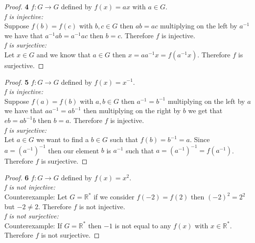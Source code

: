\documentclass[11pt]{article}
\begin{document}
		\begin{proof}{\textbf{4}} $f: G \rightarrow G$ defined by $f(x)=ax$ with $a \in G$.\\
			\textit{f is injective:}\\
				Suppose $f(b)=f(c)$ with $b,c \in G$ then $ab=ac$ multiplying on the left by $a^{-1}$ we have that $a^{-1}ab=a^{-1}ac$ then $b=c$. Therefore $f$ is injective.
			\\\textit{f is surjective:}\\
				Let $x \in G$ and we know that $a \in G$ then $x=aa^{-1}x=f(a^{-1}x)$. Therefore $f$ is surjective.
		\end{proof}
\cleardoublepage

		\begin{proof}{\textbf{5}} $f: G \rightarrow G$ defined by $f(x)=x^{-1}$.\\
			\textit{f is injective:}\\
				Suppose $f(a)=f(b)$ with $a,b \in G$ then $a^{-1}=b^{-1}$ multiplying on the left by $a$ we have that $aa^{-1}=ab^{-1}$ then multiplying on the right by $b$ we get that $eb=ab^{-1}b$ then $b=a$. Therefore $f$ is injective.
			\\\textit{f is surjective:}\\
				Let $a \in G$ we want to find a $b \in G$ such that $f(b)=b^{-1}=a$. Since $a=(a^{-1})^{-1}$ then our element $b$ is $a^{-1}$ such that $a=(a^{-1})^{-1}=f(a^{-1})$. Therefore $f$ is surjective.
		\end{proof}
		\begin{proof}{\textbf{6}} $f: G \rightarrow G$ defined by $f(x)=x^{2}$.\\
			\textit{f is not injective:}\\
				Counterexample: Let $G=\mathbb{R}^{*}$ if we consider $f(-2)=f(2)$ then $(-2)^{2}=2^{2}$ but $-2 \neq 2$. Therefore $f$ is not injective.
			\\\textit{f is not surjective:}\\
				Counterexample: If $G=\mathbb{R}^{*}$ then $-1$ is not equal to any $f(x)$ with $x \in \mathbb{R}^{*}$. Therefore $f$ is not surjective.
		\end{proof}
\end{document}

